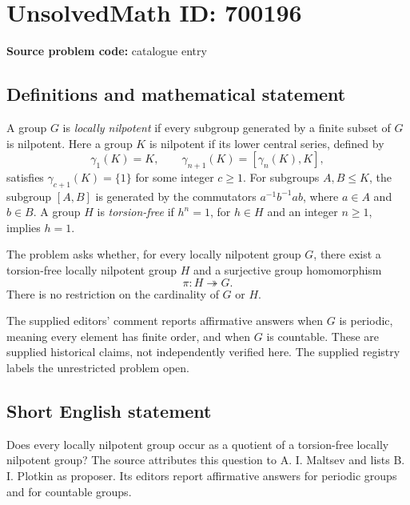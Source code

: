 \documentclass[11pt]{article}
\begin{document}
\section*{UnsolvedMath ID: 700196}
\textbf{Source problem code:} catalogue entry
\subsection{Definitions and mathematical statement}
A group \(G\) is \emph{locally nilpotent} if every subgroup generated by a finite subset of \(G\) is nilpotent. Here a group \(K\) is nilpotent if its lower central series, defined by
\[
\gamma_1(K)=K,\qquad \gamma_{n+1}(K)=[\gamma_n(K),K],
\]
satisfies \(\gamma_{c+1}(K)=\{1\}\) for some integer \(c\geq 1\). For subgroups \(A,B\leq K\), the subgroup \([A,B]\) is generated by the commutators \(a^{-1}b^{-1}ab\), where \(a\in A\) and \(b\in B\). A group \(H\) is \emph{torsion-free} if \(h^n=1\), for \(h\in H\) and an integer \(n\geq 1\), implies \(h=1\).

The problem asks whether, for every locally nilpotent group \(G\), there exist a torsion-free locally nilpotent group \(H\) and a surjective group homomorphism
\[
\pi:H\twoheadrightarrow G.
\]
There is no restriction on the cardinality of \(G\) or \(H\).

The supplied editors' comment reports affirmative answers when \(G\) is periodic, meaning every element has finite order, and when \(G\) is countable. These are supplied historical claims, not independently verified here. The supplied registry labels the unrestricted problem open.
\subsection{Short English statement}
Does every locally nilpotent group occur as a quotient of a torsion-free locally nilpotent group? The source attributes this question to A. I. Maltsev and lists B. I. Plotkin as proposer. Its editors report affirmative answers for periodic groups and for countable groups.
\end{document}
